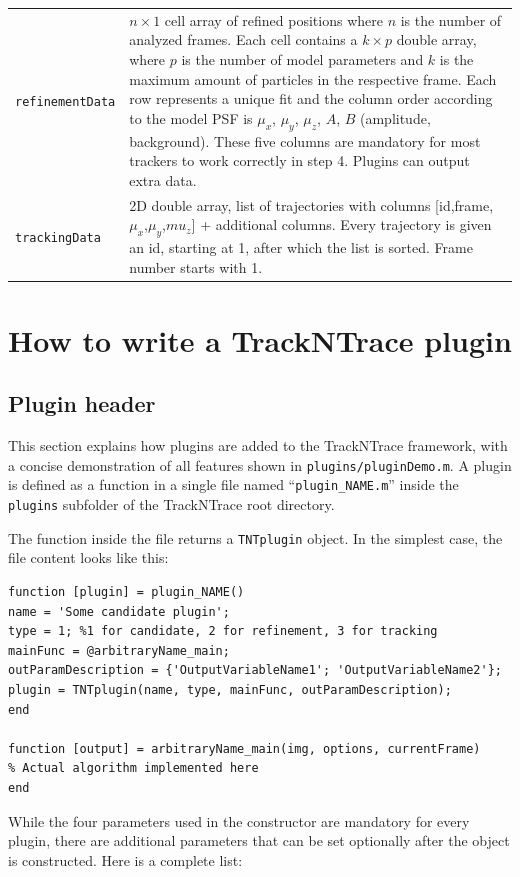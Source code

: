 \documentclass[11pt,onside]{report}
\numberwithin{equation}{chapter}
\begin{document}
\begin{table}[!h]
\begin{tabular}{p{} p{}}
\texttt{refinementData} & $n\times 1$ cell array of refined positions where $n$ is the number of analyzed frames. Each cell contains a $k\times p$ double array, where $p$ is the number of model parameters and $k$ is the maximum amount of particles in the respective frame. Each row represents a unique fit and the column order according to the model PSF is $\mu_x$, $\mu_y$, $\mu_z$, $A$, $B$ (amplitude, background). These five columns are mandatory for most trackers to work correctly in step 4. Plugins can output extra data.\\
\texttt{trackingData} & 2D double array, list of trajectories with columns  [id,frame,$\mu_x$,$\mu_y$,$mu_z$] + additional columns. Every trajectory is given an id, starting at 1, after which the list is sorted. Frame number starts with 1.\\
\bottomrule
\end{tabular}
\end{table}

\clearpage

\section{How to write a TrackNTrace plugin}\label{sec:howto_plugins}
\subsection{Plugin header}
This section explains how plugins are added to the TrackNTrace framework, with a concise demonstration of all features shown in \texttt{plugins/pluginDemo.m}. A plugin is defined as a function in a single file named ``\texttt{plugin\_NAME.m}'' inside the \texttt{plugins} subfolder of the TrackNTrace root directory. 

The function inside the file returns a \texttt{TNTplugin} object. In the simplest case, the file content looks like this:
\begin{lstlisting}[style=Matlab-editor]
function [plugin] = plugin_NAME()
name = 'Some candidate plugin';
type = 1; %1 for candidate, 2 for refinement, 3 for tracking
mainFunc = @arbitraryName_main;
outParamDescription = {'OutputVariableName1'; 'OutputVariableName2'};
plugin = TNTplugin(name, type, mainFunc, outParamDescription);
end

function [output] = arbitraryName_main(img, options, currentFrame) 
% Actual algorithm implemented here
end
\end{lstlisting}

While the four parameters used in the constructor are mandatory for every plugin, there are additional parameters that can be set optionally after the object is constructed. Here is a complete list:
\end{document}
